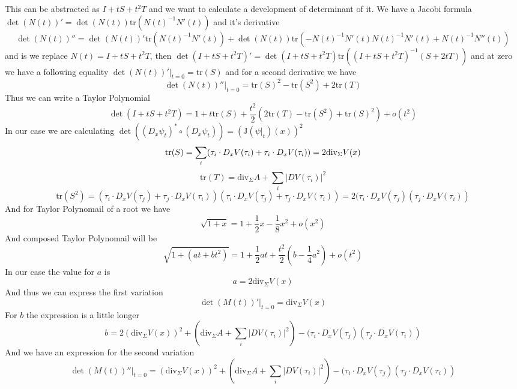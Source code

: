 This can be abstracted as $I+tS+t^2T$ and we want to calculate a development
of determinant of it. We have a Jacobi formula $\det(N(t))'=\det(N(t))\text{tr}
(N(t)^{-1}N'(t))$ and it's derivative
\[\det(N(t))''=\det(N(t))'\text{tr}(N(t)^{-1}N'(t))+\det(N(t))\text{tr}(-N(t)^
{-1}N'(t)N(t)^{-1}N'(t)+N(t)^{-1}N''(t))\]
and is we replace $N(t)=I+tS+t^2T$, then $\det(I+tS+t^2T)'=\det(I+tS+t^2T)\text{tr}
((I+tS+t^2T)^{-1}(S+2tT))$ and at zero we have a following equality
$\det(N(t))'|_{t=0}=\text{tr}(S)$ and for a second derivative we have
\[\det(N(t))''|_{t=0}=\text{tr}(S)^2-\text{tr}(S^2)+2\text{tr}(T)\]
Thus we can write a Taylor Polynomial
\[\det(I+tS+t^2T)=1+t\text{tr}(S)+\frac{t^2}{2}(2\text{tr}(T)-\text{tr}(S^2)+\text{tr}(S)^2)+o(t^2)\]
In our case we are calculating $\det((D_x\psi_t)^*\circ(D_x\psi_t))=(\text{J}(\psi|_t)(x))^2$
\[
    \text{tr}(S)=\sum_i(\tau_i\cdot D_xV(\tau_i)+\tau_i\cdot D_xV(\tau_i))=2\text{div}_\Sigma V(x)\\
\]
\[
    \text{tr}(T)=\text{div}_\Sigma A+\sum_i|DV(\tau_i)|^2
\]
\[
    \text{tr}(S^2)=(\tau_i\cdot D_xV(\tau_j)+\tau_j\cdot D_xV(\tau_i))(\tau_i\cdot D_xV(\tau_j)+\tau_j\cdot D_xV(\tau_i))
    =2(\tau_i\cdot D_xV(\tau_j)(\tau_j\cdot D_xV(\tau_i))
\]
And for Taylor Polynomail of a root we have
\[\sqrt{1+x}=1+\frac{1}{2}x-\frac{1}{8}x^2+o(x^2)\]
And composed Taylor Polynomail will be
\[\sqrt{1+(at+bt^2)}=1+\frac{1}{2}at+\frac{t^2}{2}(b-\frac{1}{4}a^2)+o(t^2)\]
In our case the value for $a$ is
\[a=2\text{div}_\Sigma V(x)\]
And thus we can express the first variation
\[\det(M(t))'|_{t=0}=\text{div}_\Sigma V(x)\]
For $b$ the expression is a little longer
\[b=2(\text{div}_\Sigma V(x))^2+(\text{div}_\Sigma A+\sum_i|DV(\tau_i)|^2)-(\tau_i\cdot D_xV(\tau_j)(\tau_j\cdot D_xV(\tau_i))\]
And we have an expression for the second variation
\[\det(M(t))''|_{t=0}=(\text{div}_\Sigma V(x))^2+(\text{div}_\Sigma A+\sum_i|DV(\tau_i)|^2)-(\tau_i\cdot D_xV(\tau_j)(\tau_j\cdot D_xV(\tau_i))\]
